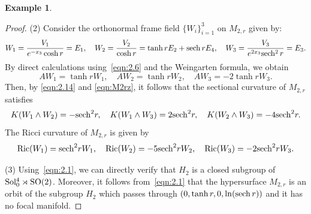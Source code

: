 \documentclass[reqno]{amsart}%
\theoremstyle{definition}
\newtheorem{example}{Example}[section]  %
\numberwithin{equation}{section}
\begin{document}
\begin{example}
\begin{proof}
			(2) Consider the orthonormal frame field $\{W_i\}_{i=1}^3$ on $M_{2,r}$ given by:
			$$
			W_1=\frac{V_1}{e^{-x_3}\cosh r}=E_1, \quad W_2=\frac{V_2}{\cosh r}=\tanh r E_2+{\rm sech}\, r E_4, \quad
			W_3=\frac{V_3}{e^{2x_3}{\rm sech^2}\, r}=E_3.
			$$
			By direct calculations using~\eqref{eqn:2.6} and the Weingarten formula, we obtain
			\begin{equation}\label{eqn:M2rz}
				AW_1=\tanh r W_1, \quad AW_2=\tanh r W_2, \quad AW_3=-2\tanh r W_3.
			\end{equation}
			Then, by \eqref{eqn:2.14} and \eqref{eqn:M2rz}, it follows that  the sectional curvature of $M_{2,r}$ satisfies
			\begin{equation}\label{eqn:M2rsec}
				K(W_1\wedge W_2)=-{\rm sech}^2 r,\quad K(W_1\wedge W_3)=2 {\rm sech}^2 r, \quad K(W_2\wedge W_3)=-4 {\rm sech}^2 r.
			\end{equation}
			The Ricci curvature of $M_{2,r}$ is given by 
			\begin{equation}\label{eqn:M2rric}
				{\rm Ric}(W_1)={\rm sech}^2 r W_1, \quad {\rm Ric}(W_2)=-5 {\rm sech}^2 r W_2,\quad {\rm Ric}(W_3)=-2 {\rm sech}^2 r W_3. 
			\end{equation}
			
			
			
			(3) Using~\eqref{eqn:2.1},
			we can directly verify that $H_2$ is a closed subgroup of
			${\rm Sol_0^4 \rtimes SO(2)}$.
			Moreover, it follows from~\eqref{eqn:2.1} that
			the hypersurface $M_{2,r}$ is an orbit of the subgroup $H_2$
			which passes through $(0,\tanh r,0,\ln ({\rm sech}\, r))$ and
			it has no focal manifold.
		\end{proof}
	\end{example}
	
\end{document}
